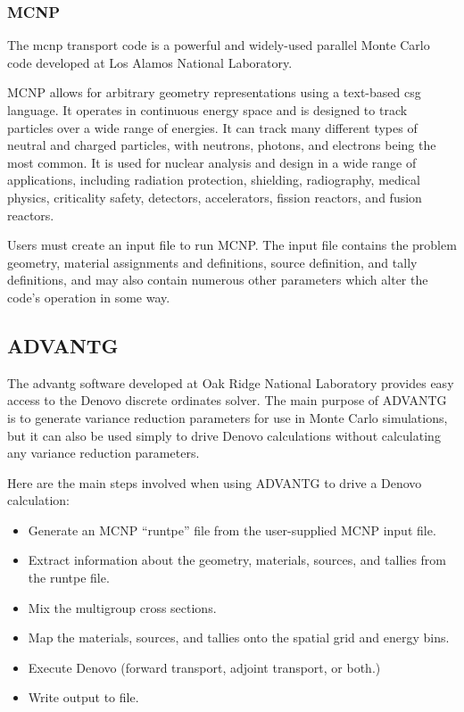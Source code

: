 \subsubsection{MCNP}
\label{sec:bg:rt:mc:mcnp}

The \ac{mcnp} transport code \cite{mcnp620} is a powerful and widely-used parallel Monte Carlo code developed at Los Alamos National Laboratory.

MCNP allows for arbitrary geometry representations using a text-based \ac{csg} language.
It operates in continuous energy space and is designed to track particles over a wide range of energies.
It can track many different types of neutral and charged particles, with neutrons, photons, and electrons being the most common.
It is used for nuclear analysis and design in a wide range of applications, including radiation protection, shielding, radiography, medical physics, criticality safety, detectors, accelerators, fission reactors, and fusion reactors.

Users must create an input file to run MCNP.
The input file contains the problem geometry, material assignments and definitions, source definition, and tally definitions, and may also contain numerous other parameters which alter the code's operation in some way.

\subsection{ADVANTG}
\label{sec:bg:rt:advantg}

The \ac{advantg} \cite{advantg} software developed at Oak Ridge National Laboratory provides easy access to the Denovo discrete ordinates solver.
The main purpose of ADVANTG is to generate variance reduction parameters for use in Monte Carlo simulations, but it can also be used simply to drive Denovo calculations without calculating any variance reduction parameters.

Here are the main steps involved when using ADVANTG to drive a Denovo calculation:
\begin{itemize}
  \item Generate an MCNP ``runtpe'' file from the user-supplied MCNP input file.
  \item Extract information about the geometry, materials, sources, and tallies from the runtpe file.
  \item Mix the multigroup cross sections.
  \item Map the materials, sources, and tallies onto the spatial grid and energy bins.
  \item Execute Denovo (forward transport, adjoint transport, or both.)
  \item Write output to file.
\end{itemize}

